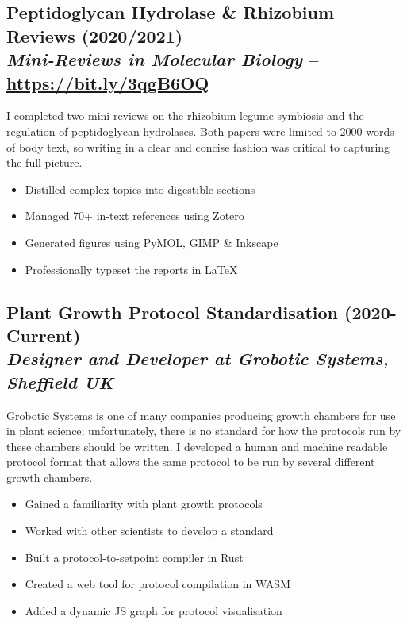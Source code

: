 \documentclass[twocolumn, a4paper, fontsize=9pt, headsepline, footsepline]{scrartcl}
\begin{document}
\subsection*{Peptidoglycan Hydrolase \& Rhizobium Reviews
  (2020/2021)\\\vspace{-3pt}\textmd{\emph{Mini-Reviews in Molecular Biology} – \url{https://bit.ly/3qgB6OQ}}}
\noindent
I completed two mini-reviews on the rhizobium-legume symbiosis and the
regulation of peptidoglycan hydrolases. Both papers were limited to 2000 words
of body text, so writing in a clear and concise fashion was critical to
capturing the full picture.
\begin{itemize}
\item Distilled complex topics into digestible sections
\item Managed 70+ in-text references using Zotero
\item Generated figures using PyMOL, GIMP \& Inkscape
\item Professionally typeset the reports in \LaTeX
\end{itemize}

\subsection*{Plant Growth Protocol Standardisation
  (2020-Current)\\\vspace{-3pt}\textmd{\emph{Designer and Developer at Grobotic Systems, Sheffield UK}}}
\noindent
Grobotic Systems is one of many companies producing growth chambers for use in
plant science; unfortunately, there is no standard for how the protocols run by
these chambers should be written. I developed a human and machine readable
protocol format that allows the same protocol to be run by several different
growth chambers.
\begin{itemize}
\item Gained a familiarity with plant growth protocols
\item Worked with other scientists to develop a standard
\item Built a protocol-to-setpoint compiler in Rust
\item Created a web tool for protocol compilation in WASM
\item Added a dynamic JS graph for protocol visualisation
\end{itemize}
\end{document}
